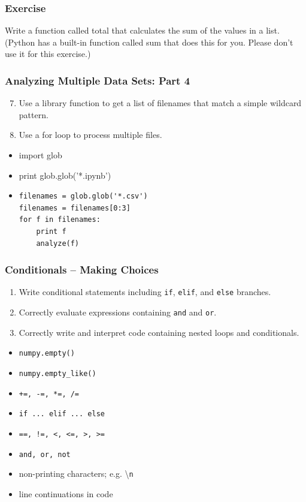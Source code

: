 \documentclass[xcolor=dvipsnames]{beamer}
\begin{document}
\begin{frame}
\frametitle{Exercise}
Write a function called total that calculates the sum of the values in a list. (Python has a built-in function called sum that does this for you. Please don't use it for this exercise.)
\end{frame}

\begin{frame}[fragile]
\frametitle{Analyzing Multiple Data Sets: Part 4}
\begin{enumerate}
\setcounter{enumi}{6}
\item     Use a library function to get a list of filenames that match a simple wildcard pattern.
\item    Use a for loop to process multiple files.
\end{enumerate}
\begin{itemize}
\item import glob
\item print glob.glob('*.ipynb')
\item
\begin{verbatim}
filenames = glob.glob('*.csv')
filenames = filenames[0:3]
for f in filenames:
    print f
    analyze(f)
\end{verbatim}
\end{itemize}
\end{frame}


\begin{frame}
\frametitle{Conditionals -- Making Choices}
\begin{enumerate}
  \item Write conditional statements including {\tt if}, {\tt elif}, and {\tt else} branches.
  \item Correctly evaluate expressions containing {\tt and} and {\tt or}.
  \item Correctly write and interpret code containing nested loops and conditionals.
\end{enumerate}
\begin{multicols}{2}
\begin{itemize}
  \item {\tt numpy.empty()}
  \item {\tt numpy.empty\_like()}
  \item {\tt +=, -=, *=, /=}
  \item {\tt if ... elif ... else}
  \item {\tt ==, !=, <, <=, >, >=}
  \item {\tt and, or, not}
  \item non-printing characters; e.g. \textbackslash{\tt n}
  \item line continuations in code
\end{itemize}
\end{multicols}
\end{frame}
\end{document}
